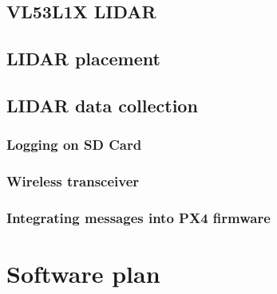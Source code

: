 \subsection{VL53L1X LIDAR}
\subsection{LIDAR placement}
\subsection{LIDAR data collection}
\subsubsection{Logging on SD Card}
\subsubsection{Wireless transceiver}
\subsubsection{Integrating messages into PX4 firmware}

\section{Software plan}